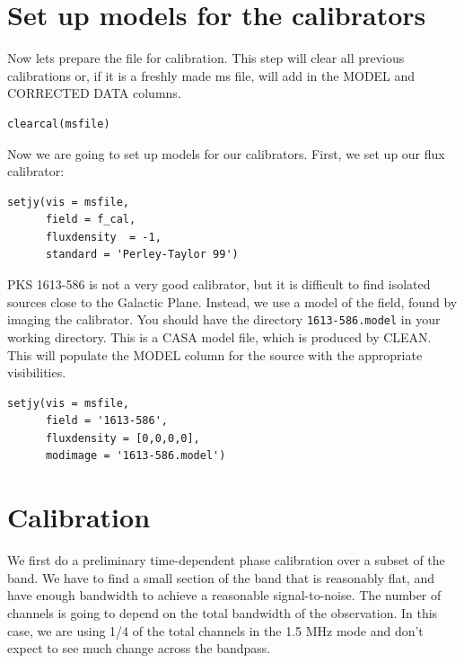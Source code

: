 \documentclass[force,almostfull,justified]{tufte-book}
\begin{document}
\section{Set up models for the calibrators}

Now lets prepare the file for calibration.  This step will clear all previous calibrations or, if it
is a freshly made ms file, will add in the MODEL and CORRECTED DATA columns.

\begin{casacmd}
\begin{verbatim}
clearcal(msfile)
\end{verbatim}
\end{casacmd}

Now we are going to set up models for our calibrators.  First, we set up our flux calibrator:

\begin{casacmd}
\begin{verbatim}
setjy(vis = msfile,
      field = f_cal,
      fluxdensity  = -1,
      standard = 'Perley-Taylor 99')
\end{verbatim}
\end{casacmd}

PKS 1613-586 is not a very good calibrator, but it is difficult to find isolated sources close to the
Galactic Plane.  Instead, we use a model of the field, found by imaging the calibrator. You should
have the directory {\tt 1613-586.model} in your working directory.  This is a CASA model file, which
is produced by CLEAN.  This will populate the MODEL column for the source with the appropriate
visibilities.

\begin{casacmd}
\begin{verbatim}
setjy(vis = msfile,
      field = '1613-586',
      fluxdensity = [0,0,0,0],
      modimage = '1613-586.model')
\end{verbatim}
\end{casacmd}


\section{Calibration}

We first do a preliminary time-dependent phase calibration over a subset of the band.  We have to find
a small section of the band that is reasonably flat, and have enough bandwidth to achieve a reasonable
signal-to-noise.  The number of channels is going to depend on the total bandwidth of the observation.
In this case, we are using  1/4 of the total channels in the 1.5 MHz mode and don't expect to see much
change across the bandpass.
\end{document}
